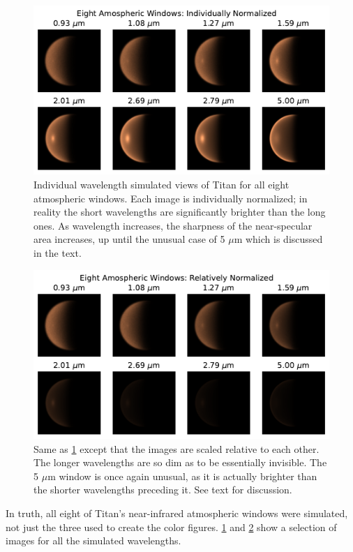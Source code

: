 \documentclass[twocolumn,linenumbers]{aastex631}
\begin{document}
\begin{figure}[htbp]
\includegraphics[scale = 0.5]{8WindowsNorm.pdf}
\centering
\caption{Individual wavelength simulated views of Titan for all eight atmospheric windows. Each image is individually normalized; in reality the short wavelengths are significantly brighter than the long ones. As wavelength increases, the sharpness of the near-specular area increases, up until the unusual case of 5 $\mu$m which is discussed in the text.}
\label{fig:7}
\end{figure}
\begin{figure}[htbp]
\includegraphics[scale = 0.5]{8WindowsNoNorm.pdf}
\centering
\caption{Same as \ref{fig:7} except that the images are scaled relative to each other. The longer wavelengths are so dim as to be essentially invisible. The 5 $\mu$m window is once again unusual, as it is actually brighter than the shorter wavelengths preceding it. See text for discussion.}
\label{fig:8}
\end{figure}

In truth, all eight of Titan's near-infrared atmospheric windows were simulated, not just the three used to create the color figures. \ref{fig:7} and \ref{fig:8} show a selection of images for all the simulated wavelengths.
\end{document}
